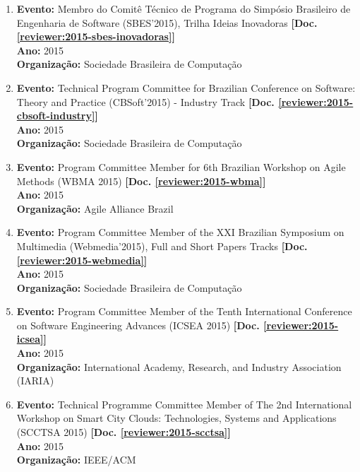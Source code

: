 \documentclass[a4paper,oneside,10pt]{article}
\begin{document}
\begin{enumerate}
\item \textbf{Evento:} Membro do Comitê Técnico de Programa do Simpósio Brasileiro de Engenharia de Software (SBES'2015), Trilha Ideias Inovadoras \textbf{[Doc. \ref{reviewer:2015-sbes-inovadoras}]}\\
      \textbf{Ano:} 2015 \\
      \textbf{Organiza\c{c}\~{a}o:} Sociedade Brasileira de Computa\c{c}\~{a}o

\item \textbf{Evento:} Technical Program Committee for Brazilian Conference on Software: Theory and Practice (CBSoft'2015) - Industry Track \textbf{[Doc. \ref{reviewer:2015-cbsoft-industry}]}\\
      \textbf{Ano:} 2015 \\
      \textbf{Organiza\c{c}\~{a}o:} Sociedade Brasileira de Computa\c{c}\~{a}o

\item \textbf{Evento:} Program Committee Member for 6th Brazilian Workshop on Agile Methods (WBMA 2015) \textbf{[Doc. \ref{reviewer:2015-wbma}]}\\
      \textbf{Ano:} 2015 \\
      \textbf{Organiza\c{c}\~{a}o:} Agile Alliance Brazil

\item \textbf{Evento:} Program Committee Member of the XXI Brazilian Symposium on Multimedia (Webmedia'2015), Full and Short Papers Tracks \textbf{[Doc. \ref{reviewer:2015-webmedia}]}\\
      \textbf{Ano:} 2015 \\
      \textbf{Organiza\c{c}\~{a}o:} Sociedade Brasileira de Computa\c{c}\~{a}o

\item \textbf{Evento:} Program Committee Member of the Tenth International Conference on Software Engineering Advances (ICSEA 2015) \textbf{[Doc. \ref{reviewer:2015-icsea}]}\\
      \textbf{Ano:} 2015 \\
      \textbf{Organiza\c{c}\~{a}o:} International Academy, Research, and Industry Association (IARIA)

\item \textbf{Evento:} Technical Programme Committee Member of The 2nd International Workshop on Smart City Clouds: Technologies, Systems and Applications (SCCTSA 2015) \textbf{[Doc. \ref{reviewer:2015-scctsa}]} \\
      \textbf{Ano:} 2015 \\
      \textbf{Organiza\c{c}\~{a}o:} IEEE/ACM


\end{enumerate}
\end{document}
